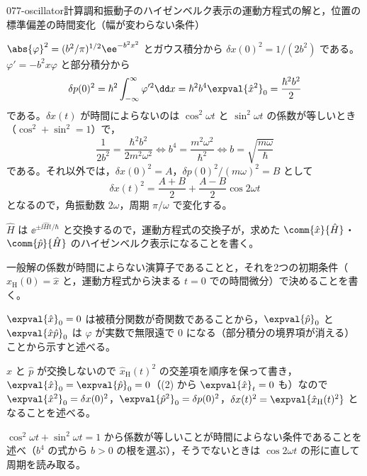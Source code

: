 \documentclass[uplatex,dvipdfmx,a4paper,11pt]{jsarticle}
\begin{document}
\begin{mondai}{077-oscillator}{計算}{調和振動子のハイゼンベルク表示の運動方程式の解と，位置の標準偏差の時間変化（幅が変わらない条件）}
\begin{tadashii}
 $\abs{\varphi}^{2}=(b^{2}/\pi)^{1/2}\ee^{-b^{2}x^{2}}$ とガウス積分から $\delta x(0)^{2}=1/(2b^{2})$ である。$\varphi'=-b^{2}x\varphi$ と部分積分から
\[ \delta p(0)^{2}=\hbar^{2}\int_{-\infty}^{\infty}\varphi'^{2}\dd x=\hbar^{2}b^{4}\expval{\hat{x}^{2}}_{0}=\frac{\hbar^{2}b^{2}}{2} \]
である。$\delta x(t)$ が時間によらないのは $\cos^{2}\omega t$ と $\sin^{2}\omega t$ の係数が等しいとき（$\cos^{2}+\sin^{2}=1$）で，
\[ \frac{1}{2b^{2}}=\frac{\hbar^{2}b^{2}}{2m^{2}\omega^{2}}\iff b^{4}=\frac{m^{2}\omega^{2}}{\hbar^{2}}\iff b=\sqrt{\frac{m\omega}{\hbar}} \]
である。それ以外では，$\delta x(0)^{2}=A$，$\delta p(0)^{2}/(m\omega)^{2}=B$ として
\[ \delta x(t)^{2}=\frac{A+B}{2}+\frac{A-B}{2}\cos2\omega t \]
となるので，角振動数 $2\omega$，周期 $\pi/\omega$ で変化する。
\begin{ronten}
  \item {} $\hat{H}$ は $\ee^{\pm\ii\hat{H}t/\hbar}$ と交換するので，運動方程式の交換子が，求めた $\comm{\hat{x}}{\hat{H}}$・$\comm{\hat{p}}{\hat{H}}$ のハイゼンベルク表示になることを書く。
  \item {} 一般解の係数が時間によらない演算子であることと，それを2つの初期条件（$\hat{x}_{\mathrm{H}}(0)=\hat{x}$ と，運動方程式から決まる $t=0$ での時間微分）で決めることを書く。
  \item {} $\expval{\hat{x}}_{0}=0$ は被積分関数が奇関数であることから，$\expval{\hat{p}}_{0}$ と $\expval{\hat{x}\hat{p}}_{0}$ は $\varphi$ が実数で無限遠で $0$ になる（部分積分の境界項が消える）ことから示すと述べる。
  \item {} $\hat{x}$ と $\hat{p}$ が交換しないので $\hat{x}_{\mathrm{H}}(t)^{2}$ の交差項を順序を保って書き，$\expval{\hat{x}}_{0}=\expval{\hat{p}}_{0}=0$（(2) から $\expval{\hat{x}}_{t}=0$ も）なので $\expval{\hat{x}^{2}}_{0}=\delta x(0)^{2}$，$\expval{\hat{p}^{2}}_{0}=\delta p(0)^{2}$，$\delta x(t)^{2}=\expval{\hat{x}_{\mathrm{H}}(t)^{2}}$ となることを述べる。
  \item {} $\cos^{2}\omega t+\sin^{2}\omega t=1$ から係数が等しいことが時間によらない条件であることを述べ（$b^{4}$ の式から $b>0$ の根を選ぶ），そうでないときは $\cos2\omega t$ の形に直して周期を読み取る。

\end{ronten}
\end{tadashii}
\end{mondai}
\end{document}
